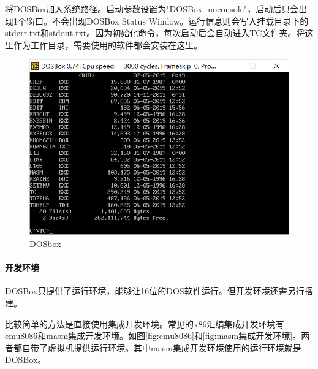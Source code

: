 \documentclass{ctexart}
\begin{document}
	将DOSBox加入系统路径。启动参数设置为"DOSBox -noconsole"，启动后只会出现1个窗口。不会出现DOSBox Status Window。运行信息则会写入挂载目录下的stderr.txt和stdout.txt。因为初始化命令，每次启动后会自动进入TC文件夹。将这里作为工作目录，需要使用的软件都会安装在这里。

	\begin{figure}[htpb]
		\centering
		\includegraphics[width=0.8\linewidth]{DOSBox.png}
		\caption{DOSbox}
		\label{fig:DOSBox}
	\end{figure}

	\paragraph{开发环境}%
	\label{par:开发环境}

	DOSBox只提供了运行环境，能够让16位的DOS软件运行。但开发环境还需另行搭建。

	比较简单的方法是直接使用集成开发环境。常见的x86汇编集成开发环境有emu8086和masm集成开发环境。如图\ref{fig:emu8086}和\ref{fig:masm集成开发环境}。两者都自带了虚拟机提供运行环境。其中masm集成开发环境使用的运行环境就是DOSBox。
\end{document}
